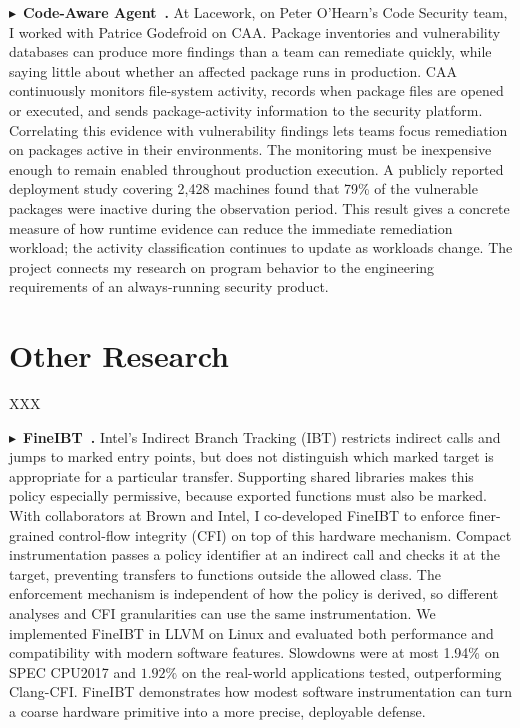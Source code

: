 \documentclass[10pt,letterpaper]{article}
\newcommand{\project}[2]{\par\Needspace{6\baselineskip}\noindent
  $\blacktriangleright$~\textbf{#1~\cite{#2}.}}
\begin{document}
\project{Code-Aware Agent}{caa,caa_patent}
At Lacework, on Peter O'Hearn's Code Security team, I worked with Patrice
Godefroid on CAA. Package inventories and vulnerability databases can produce
more findings than a team can remediate quickly, while saying little about
whether an affected package runs in production. CAA continuously monitors
file-system activity, records when package files are opened or executed, and
sends package-activity information to the security platform. Correlating this
evidence with vulnerability findings lets teams focus remediation on packages
active in their environments. The monitoring must be inexpensive enough to
remain enabled throughout production execution. A publicly reported deployment
study covering 2,428 machines found that 79\% of the vulnerable packages were
inactive during the observation period. This result gives a concrete measure
of how runtime evidence can reduce the immediate remediation workload; the
activity classification continues to update as workloads change. The project
connects my research on program behavior to the engineering requirements of
an always-running security product.


\section{Other Research}
XXX

\project{FineIBT}{fineibt}
Intel's Indirect Branch Tracking (IBT) restricts indirect calls and jumps to
marked entry points, but does not distinguish which marked target is
appropriate for a particular transfer. Supporting shared libraries makes this
policy especially permissive, because exported functions must also be marked.
With collaborators at Brown and Intel, I co-developed FineIBT to enforce
finer-grained control-flow integrity (CFI) on top of this hardware mechanism.
Compact instrumentation passes a policy identifier at an indirect call and
checks it at the target, preventing transfers to functions outside the allowed
class. The enforcement mechanism is independent of how the policy is derived,
so different analyses and CFI granularities can use the same instrumentation.
We implemented FineIBT in LLVM on Linux and evaluated both performance and
compatibility with modern software features. Slowdowns were at most 1.94\%
on SPEC CPU2017 and $1.92\%$ on the real-world applications tested, outperforming
Clang-CFI. FineIBT demonstrates how modest software instrumentation can turn
a coarse hardware primitive into a more precise, deployable defense.
\end{document}
